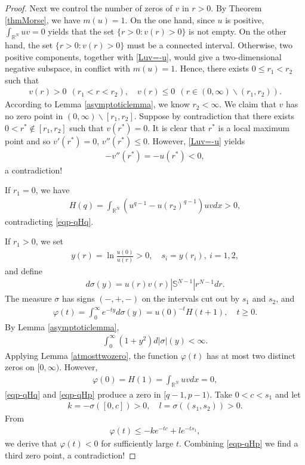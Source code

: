 \documentclass{article}
\theoremstyle{definition} \theoremstyle{remark}
\numberwithin{equation}{section}
\newcommand{\R}{\mathbb{R}}
\begin{document}
\begin{proof}
		Next we control the number of zeros of $v$ in $r > 0$. By Theorem \ref{thmMorse}, we have $m(u) = 1$. On the one hand, since $u$ is positive, $\int_{\R^N}uv = 0$ yields that the set $\{r > 0: v(r) > 0\}$ is not empty. On the other hand, the set $\{r > 0: v(r) > 0\}$ must be a connected interval. Otherwise, two positive components, together with \eqref{Luv=-u}, would give a two-dimensional negative subspace, in conflict with $m(u) = 1$. Hence, there exists $0 \le r_1 < r_2$ such that
		\begin{align*}
			v(r) > 0 ~~ (r_1 < r < r_2), \quad v(r) \le 0 ~~ (r \in (0,\infty) \backslash (r_1,r_2)).
		\end{align*}
		According to Lemma \ref{asymptoticlemma}, we know $r_2 < \infty$. We claim that $v$ has no zero point in $(0,\infty)\backslash[r_1,r_2]$. Suppose by contradiction that there exists $0 < r^* \notin [r_1,r_2]$ such that $v(r^*) = 0$. It is clear that $r^*$ is a local maximum point and so $v'(r^*) = 0$, $v''(r^*) \le 0$. However, \eqref{Luv=-u} yields
		\begin{align*}
			-v''(r^*) = -u(r^*) < 0,
		\end{align*}
		a contradiction!

		If $r_1 = 0$, we have
		\begin{align*}
			H(q) = \int_{\R^N}\left(u^{q-1} - u(r_2)^{q-1}\right)uvdx > 0,
		\end{align*}
		contradicting \eqref{eqp-qHq}.

		If $r_1 > 0$, we set
		\begin{align*}
			y(r) = \ln \frac{u(0)}{u(r)} > 0, \quad s_i = y(r_i), ~ i = 1,2,
		\end{align*}
		and define
		\begin{align*}
			d\sigma(y) = u(r)v(r)|\mathbb{S}^{N-1}|r^{N-1}dr.
		\end{align*}
		The measure $\sigma$ has signs $(-,+,-)$ on the intervals cut out by $s_1$ and $s_2$, and
		\begin{align*}
			\varphi(t) = \int_0^\infty e^{-ty}d\sigma(y) = u(0)^{-t}H(t+1), \quad t \ge 0.
		\end{align*}
		By Lemma \ref{asymptoticlemma},
		\begin{align*}
			\int_0^\infty \left(1 + y^2\right)d|\sigma|(y) < \infty.
		\end{align*}
		Applying Lemma \ref{atmosttwozero}, the function $\varphi(t)$ has at most two distinct zeros on $[0,\infty)$. However,
		\begin{align*}
			\varphi(0) = H(1) = \int_{\R^N}uv dx = 0,
		\end{align*}
		\eqref{eqp-qHq} and \eqref{eqp-qHp} produce a zero in $[q-1,p-1)$. Take $0 < c < s_1$ and let
		\begin{align*}
			k = -\sigma\left([0,c]\right) > 0, \quad l = \sigma\left((s_1,s_2)\right) > 0.
		\end{align*}
		From
		\begin{align*}
			\varphi(t) \le -ke^{-tc} + le^{-ts_1},
		\end{align*}
		we derive that $\varphi(t) < 0$ for sufficiently large $t$. Combining \eqref{eqp-qHp} we find a third zero point, a contradiction!
	\end{proof}
\end{document}
